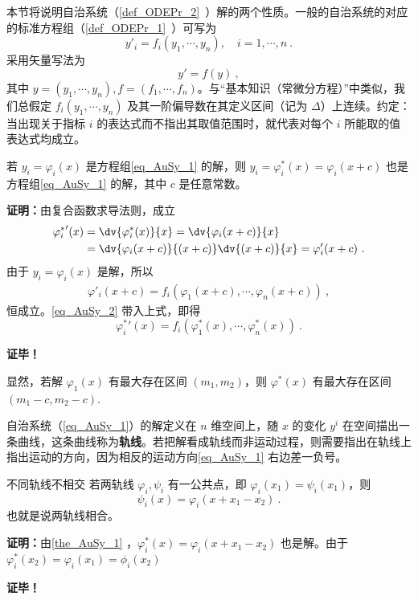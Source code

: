 
本节将说明自治系统（\autoref{def_ODEPr_2}~）解的两个性质。一般的自治系统的对应的标准方程组（\autoref{def_ODEPr_1}~）可写为
\begin{equation}\label{eq_AuSy_1}
y'_i=f_i(y_1,\cdots,y_n),\quad i=1,\cdots,n~.
\end{equation}
采用矢量写法为
\begin{equation}
y'=f(y)~,
\end{equation}
其中 $y=(y_1,\cdots,y_n),f=(f_1,\cdots,f_n)$。与“基本知识（常微分方程）”中类似，我们总假定 $f_i(y_1,\cdots,y_n)$ 及其一阶偏导数在其定义区间（记为 $\Delta$）上连续。约定：当出现关于指标 $i$ 的表达式而不指出其取值范围时，就代表对每个 $i$ 所能取的值表达式均成立。

\begin{theorem}{}\label{the_AuSy_1}
若 $y_i=\varphi_i(x)$ 是方程组\autoref{eq_AuSy_1} 的解，则 $y_i=\varphi^*_i(x)=\varphi_i(x+c)$ 也是方程组\autoref{eq_AuSy_1} 的解，其中 $c$ 是任意常数。
\end{theorem}
\textbf{证明：}由复合函数求导法则，成立
\begin{equation}\label{eq_AuSy_2}
\begin{aligned}
{\varphi^*_i}'(x)&=\dv{\varphi^*_i(x)}{x}=\dv{\varphi_i(x+c)}{x}\\
&=\dv{\varphi_i(x+c)}{(x+c)}\dv{(x+c)}{x}=\varphi'_i(x+c)~.
\end{aligned}
\end{equation}
由于 $y_i=\varphi_i(x)$ 是解，所以
\begin{equation}
\begin{aligned}
\varphi'_i(x+c)=f_i(\varphi_1(x+c),\cdots,\varphi_n(x+c))~,
\end{aligned}
\end{equation}
恒成立。\autoref{eq_AuSy_2} 带入上式，即得
\begin{equation}
{\varphi^*_i}'(x)=f_i(\varphi^*_1(x),\cdots,\varphi^*_n(x))~.
\end{equation}

\textbf{证毕！}

显然，若解 $\varphi_1(x)$ 有最大存在区间 $(m_1,m_2)$，则 $\varphi^*(x)$ 有最大存在区间 $(m_1-c,m_2-c)$.

自治系统（\autoref{eq_AuSy_1}）的解定义在 $n$ 维空间上，随 $x$ 的变化 $y^i$ 在空间描出一条曲线，这条曲线称为\textbf{轨线}。若把解看成轨线而非运动过程，则需要指出在轨线上指出运动的方向，因为相反的运动方向\autoref{eq_AuSy_1} 右边差一负号。

\begin{theorem}{不同轨线不相交}
若两轨线 $\varphi_i,\psi_i$ 有一公共点，即 $\varphi_i(x_1)=\psi_i(x_1)$，则
\begin{equation}
\psi_i(x)=\varphi_i(x+x_1-x_2)~.
\end{equation}
也就是说两轨线相合。
\end{theorem}
\textbf{证明：}由\autoref{the_AuSy_1} ，$\varphi^*_i(x)=\varphi_i(x+x_1-x_2)$ 也是解。由于 $\varphi^*_i(x_2)=\varphi_i(x_1)=\phi_i(x_2)$

\textbf{证毕！}